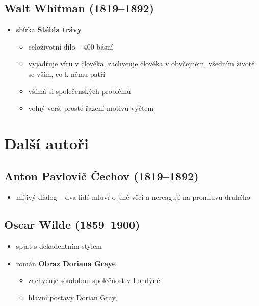 \subsection{Walt Whitman (1819--1892)}
\begin{itemize}
\item sbírka \textbf{Stébla trávy}
	\begin{itemize}
	\item celoživotní dílo -- 400 básní
	\item vyjadřuje víru v člověka, zachycuje člověka v obyčejném, všedním životě se vším, co k němu patří
	\item všímá si společenských problémů
	\item volný verš, prosté řazení motivů výčtem
	\end{itemize}
\end{itemize}

\section{Další autoři}
\subsection{Anton Pavlovič Čechov (1819--1892)}
\begin{itemize}
\item míjivý dialog -- dva lidé mluví o jiné věci a nereagují na promluvu druhého
\end{itemize}

\subsection{Oscar Wilde (1859--1900)}
\begin{itemize}
\item spjat s dekadentním stylem
\item román \textbf{Obraz Doriana Graye}
	\begin{itemize}
	\item zachycuje soudobou společnost v Londýně
	\item hlavní postavy Dorian Gray, 
	\end{itemize}
\end{itemize}


